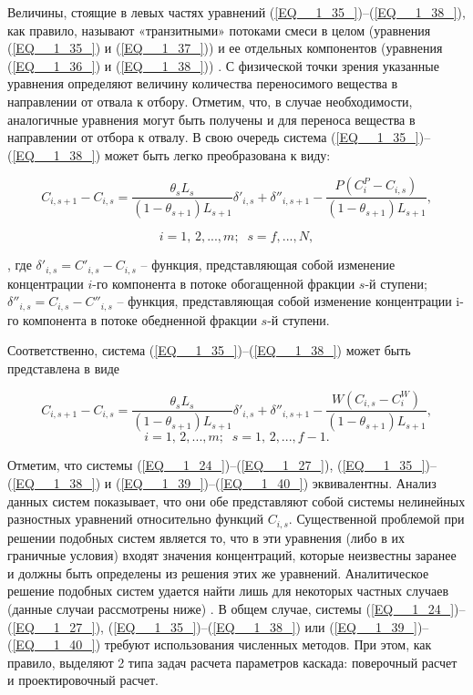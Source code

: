 Величины, стоящие в левых частях уравнений (\ref{EQ__1_35_})--(\ref{EQ__1_38_}), как правило, называют «транзитными» потоками смеси в целом (уравнения (\ref{EQ__1_35_}) и (\ref{EQ__1_37_})) и ее отдельных компонентов (уравнения (\ref{EQ__1_36_}) и (\ref{EQ__1_38_})) \cite{sulaberidzeTeoriyaKaskadovDlya2011}. С физической точки зрения указанные уравнения определяют величину количества переносимого вещества в направлении от отвала к отбору. Отметим, что, в случае необходимости, аналогичные уравнения могут быть получены и для переноса вещества в направлении от отбора к отвалу. 
В свою очередь система (\ref{EQ__1_35_})--(\ref{EQ__1_38_}) может быть легко преобразована к виду:

\begin{equation} \label{EQ__1_39_} 
  C_{i,s+1} -C_{i,s} =\frac{\theta _{s} L_{s} }{(1-\theta _{s+1} )L_{s+1} } \delta '_{i,s} +\delta ''_{i,s+1} -\frac{P\left(C_{i}^{P} -C_{i,s} \right)}{(1-\theta _{s+1} )L_{s+1} } ,        
  \end{equation} 

\[i=1,\, 2,...,m;\; \; s=f,...,N,\] 

, где $\delta '_{i,s} =C'_{i,s} -C_{i,s} $ -- функция, представляющая собой изменение концентрации $i$-го компонента в потоке обогащенной фракции $s$-й ступени; $\delta ''_{i,s} =C_{i,s} -C''_{i,s} $ – функция, представляющая собой изменение концентрации i-го компонента в потоке обедненной фракции $s$-й ступени.

Соответственно, система (\ref{EQ__1_35_})--(\ref{EQ__1_38_}) может быть представлена в виде

\begin{equation} \label{EQ__1_40_} 
  C_{i,s+1} -C_{i,s} =\frac{\theta _{s} L_{s} }{(1-\theta _{s+1} )L_{s+1} } \delta '_{i,s} +\delta ''_{i,s+1} -\frac{W(C_{i,s} -C_{i}^{W} )}{(1-\theta _{s+1} )L_{s+1} } ,        
  \end{equation} 
  \[i=1,\, 2,...,m;\; \; s=1,\, 2,...,f-1.\] 

Отметим, что системы (\ref{EQ__1_24_})--(\ref{EQ__1_27_}), (\ref{EQ__1_35_})--(\ref{EQ__1_38_}) и (\ref{EQ__1_39_})--(\ref{EQ__1_40_}) эквивалентны. Анализ данных систем показывает, что они обе представляют собой системы нелинейных разностных уравнений относительно функций $C_{i,s}$. Существенной проблемой при решении подобных систем является то, что в эти уравнения (либо в их граничные условия) входят значения концентраций, которые неизвестны заранее и должны быть определены из решения этих же уравнений. Аналитическое решение подобных систем удается найти лишь для некоторых частных случаев (данные случаи рассмотрены ниже) \cite{sulaberidzeTeoriyaKaskadovDlya2011}. В общем случае, системы (\ref{EQ__1_24_})--(\ref{EQ__1_27_}), (\ref{EQ__1_35_})--(\ref{EQ__1_38_}) или (\ref{EQ__1_39_})--(\ref{EQ__1_40_}) требуют использования численных методов. При этом, как правило, выделяют 2 типа задач расчета параметров каскада: поверочный расчет и проектировочный расчет.


